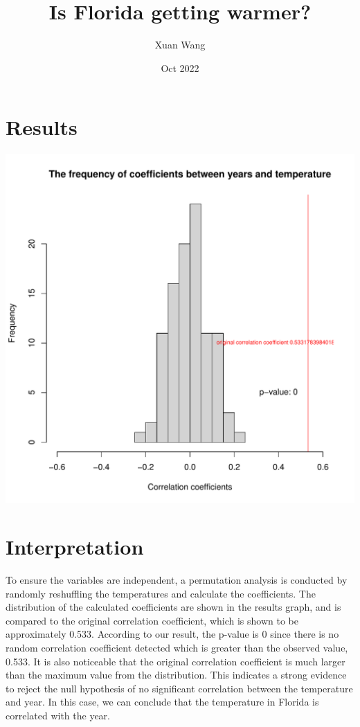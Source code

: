 \documentclass[11pt, oneside]{article}
\title{Is Florida getting warmer?}
\author{Xuan Wang}
\date{Oct 2022}
\begin{document}
\maketitle


\section{Results}
\begin{center}
\includegraphics[scale = 0.7]{../data/Floridaplot.pdf}
\end{center}
\section{Interpretation}
To ensure the variables are independent, a permutation analysis is conducted by randomly reshuffling the temperatures and calculate the coefficients. The distribution of the calculated coefficients are shown in the results graph, and is compared to the original correlation coefficient, which is shown to be approximately 0.533.
\bigbreak
\noindent According to our result, the p-value is 0 since there is no random correlation coefficient detected which is greater than the observed value, 0.533. It is also noticeable that the original correlation coefficient is much larger than the maximum value from the distribution. This indicates a strong evidence to reject the null hypothesis of no significant correlation between the temperature and year. In this case, we can conclude that the temperature in Florida is correlated with the year.
\end{document}

